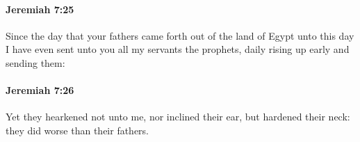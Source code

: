 		\paragraph{Jeremiah 7:25} %
			\label{JEREMIAH-7-25}

			Since the day that your fathers came forth out of the land of Egypt unto this day I have even sent unto you all my servants the prophets, daily rising up early and sending them:


		\paragraph{Jeremiah 7:26} %
			\label{JEREMIAH-7-26}

			Yet they hearkened not unto me, nor inclined their ear, but hardened their neck: they did worse than their fathers.


